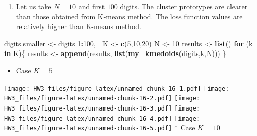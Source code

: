 \documentclass[]{article}
\newenvironment{Shaded}{\begin{snugshade}}{\end{snugshade}}
\newcommand{\KeywordTok}[1]{\textcolor[rgb]{0.13,0.29,0.53}{\textbf{#1}}}
\newcommand{\DecValTok}[1]{\textcolor[rgb]{0.00,0.00,0.81}{#1}}
\newcommand{\StringTok}[1]{\textcolor[rgb]{0.31,0.60,0.02}{#1}}
\newcommand{\ControlFlowTok}[1]{\textcolor[rgb]{0.13,0.29,0.53}{\textbf{#1}}}
\newcommand{\OperatorTok}[1]{\textcolor[rgb]{0.81,0.36,0.00}{\textbf{#1}}}
\newcommand{\NormalTok}[1]{#1}
\providecommand{\tightlist}{%
  \setlength{\itemsep}{0pt}\setlength{\parskip}{0pt}}
\begin{document}
\begin{enumerate}
\def\labelenumi{\arabic{enumi}.}
\setcounter{enumi}{7}
\tightlist
\item
  Let us take \(N = 10\) and first \(100\) digits. The cluster
  prototypes are clearer than those obtained from K-means method. The
  loss function values are relatively higher than K-means method.
\end{enumerate}

\begin{Shaded}
\begin{Highlighting}[]
\NormalTok{digits.smaller <-}\StringTok{ }\NormalTok{digits[}\DecValTok{1}\OperatorTok{:}\DecValTok{100}\NormalTok{, ]}
\NormalTok{K <-}\StringTok{ }\KeywordTok{c}\NormalTok{(}\DecValTok{5}\NormalTok{,}\DecValTok{10}\NormalTok{,}\DecValTok{20}\NormalTok{)}
\NormalTok{N <-}\StringTok{ }\DecValTok{10}
\NormalTok{results <-}\StringTok{ }\KeywordTok{list}\NormalTok{()}
\ControlFlowTok{for}\NormalTok{ (k }\ControlFlowTok{in}\NormalTok{ K)\{}
\NormalTok{  results <-}\StringTok{ }\KeywordTok{append}\NormalTok{(results, }\KeywordTok{list}\NormalTok{(}\KeywordTok{my_kmedoids}\NormalTok{(digits,k,N)))}
\NormalTok{\}}
\end{Highlighting}
\end{Shaded}

\begin{itemize}
\tightlist
\item
  Case \(K = 5\)
\end{itemize}

\begin{Shaded}
\end{Shaded}

\texttt{[image: HW3\_files/figure-latex/unnamed-chunk-16-1.pdf]}
\texttt{[image: HW3\_files/figure-latex/unnamed-chunk-16-2.pdf]}
\texttt{[image: HW3\_files/figure-latex/unnamed-chunk-16-3.pdf]}
\texttt{[image: HW3\_files/figure-latex/unnamed-chunk-16-4.pdf]}
\texttt{[image: HW3\_files/figure-latex/unnamed-chunk-16-5.pdf]} * Case
\(K = 10\)

\begin{Shaded}
\end{Shaded}
\end{document}
